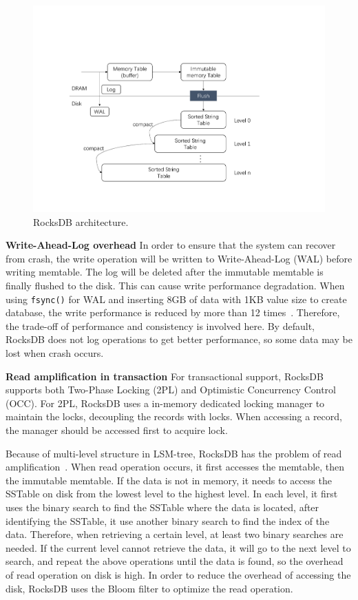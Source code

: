 \begin{figure}
    \centering
    \includegraphics[width=0.36\paperwidth]{figure/rocksdb.pdf}
    \caption{RocksDB architecture.}
    \label{fig:rocksdb}
\end{figure}


\textbf{Write-Ahead-Log overhead} In order to ensure that the system can recover from crash, the write operation will be written to Write-Ahead-Log (WAL) before writing memtable. The log will be deleted after the immutable memtable is finally flushed to the disk. This can cause write performance degradation. When using \texttt{fsync()} for WAL and inserting 8GB of data with 1KB value size to create database, the write performance is reduced by more than 12 times~\cite{SLMDB}. Therefore, the trade-off of performance and consistency is involved here. By default, RocksDB does not log operations to get better performance, so some data may be lost when crash occurs. 

\textbf{Read amplification in transaction} For transactional support, RocksDB supports both Two-Phase Locking (2PL) and Optimistic Concurrency Control (OCC). For 2PL, RocksDB uses a in-memory dedicated locking manager to maintain the locks, decoupling the records with locks. When accessing a record, the manager should be accessed first to acquire lock. 

Because of multi-level structure in LSM-tree, RocksDB has the problem of read amplification~\cite{WiscKey,NVMKV,PebblesDB}. When read operation occurs, it first accesses the memtable, then the immutable memtable. If the data is not in memory, it needs to access the SSTable on disk from the lowest level to the highest level. In each level, it first uses the binary search to find the SSTable where the data is located, after identifying the SSTable, it use another binary search to find the index of the data. Therefore, when retrieving a certain level, at least two binary searches are needed. If the current level cannot retrieve the data, it will go to the next level to search, and repeat the above operations until the data is found, so the overhead of read operation on disk is high. In order to reduce the overhead of accessing the disk, RocksDB uses the Bloom filter to optimize the read operation.

